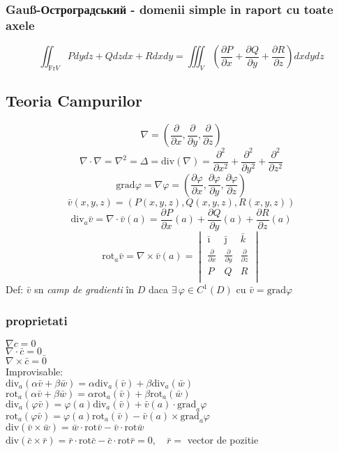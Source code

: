 \documentclass{article}
\newcommand{\parti}[2]{\frac{\partial #1}{ \partial #2}}
\newcommand{\partii}[2]{\frac{\partial^2 #1}{ \partial #2^2}}
\newcommand*{\grad}{\mathrm{grad}}
\renewcommand*{\div}{\mathrm{div}}
\newcommand*{\rot}{\mathrm{rot}}
\begin{document}
\subsubsection*{Gauß-Остроградський - domenii simple in raport cu toate axele}
\[ \iint_{\mathrm{Fr} V}Pdydz+Qdzdx+Rdxdy = \iiint_V \left( \parti P x + \parti Q y + \parti R z \right) dx dy dz \]
\subsection*{Teoria Campurilor}
\[ \nabla = (\parti{}{x}, \parti{}{y}, \parti{}{z}) \]
\[ \nabla \cdot \nabla = \nabla^2 = \Delta = \div(\nabla) = \partii{}{x}+\partii{}{y} +\partii{}{z} \]
\[ \grad \varphi = \nabla \varphi = (\parti{\varphi}{x}, \parti{\varphi}{y}, \parti{\varphi}{z}) \]
\[ \bar{v} (x, y, z) = (P(x, y, z), Q(x,y,z ), R(x, y,z)) \]
\[ \div_a\bar{v} = \nabla \cdot \bar{v}(a) = \parti{P}{x}(a)+\parti{Q}{y}(a) + \parti{R}{z}(a)\]
\[ \rot_a\bar{v} = \nabla \times \bar{v}(a) = \begin{vmatrix}
    \bar{\imath} & \bar{\jmath} & \bar{k}\\
    \parti{}{x}& \parti{}{y} & \parti{}{z} \\
    P & Q & R\\
  \end{vmatrix} \]
Def: $\bar{v}$ sn \emph{camp de gradienti} în $D$ daca $\exists\, \varphi \in C^1(D) $ cu $\bar{v} = \grad \varphi $
\subsubsection*{proprietati}
$\nabla c = 0$\\
$\nabla \cdot \bar{c} = 0$\\
$\nabla \times \bar{c} = \bar 0$\\
Improvisable:\\
$\div_a(\alpha \bar{v} + \beta \bar{w}) = \alpha \div_a(\bar v) + \beta \div_a(\bar w)$\\
$\rot_a(\alpha \bar{v} + \beta \bar{w}) = \alpha \rot_a(\bar v) + \beta \rot_a(\bar w)$\\
$\div_a(\varphi \bar v) = \varphi(a) \div_a(\bar v) + \bar v (a) \cdot \grad_a \varphi$\\
$\rot_a(\varphi \bar v) = \varphi(a) \rot_a(\bar v) - \bar v (a) \times \grad_a \varphi$\\
$\div(\bar v \times \bar w)= \bar w \cdot \rot \bar v - \bar v \cdot \rot \bar w$\\
$\div(\bar c \times \bar r)= \bar r \cdot \rot \bar c - \bar c \cdot \rot \bar r = 0, \quad \bar r = $ vector de pozitie \\
\end{document}
